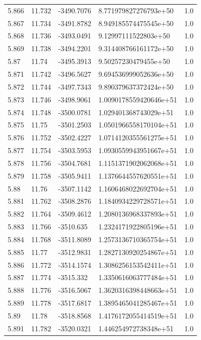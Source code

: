 \begin{tabular}{lllll}
5.866 & 11.732 & -3490.7076 & 8.771979827276793e+50 & 1.0 \\
5.867 & 11.734 & -3491.8782 & 8.949185574475545e+50 & 1.0 \\
5.868 & 11.736 & -3493.0491 & 9.12997111522803e+50 & 1.0 \\
5.869 & 11.738 & -3494.2201 & 9.314408766161172e+50 & 1.0 \\
5.87 & 11.74 & -3495.3913 & 9.50257230479455e+50 & 1.0 \\
5.871 & 11.742 & -3496.5627 & 9.694536999052636e+50 & 1.0 \\
5.872 & 11.744 & -3497.7343 & 9.890379637372424e+50 & 1.0 \\
5.873 & 11.746 & -3498.9061 & 1.0090178559420646e+51 & 1.0 \\
5.874 & 11.748 & -3500.0781 & 1.029401368743029e+51 & 1.0 \\
5.875 & 11.75 & -3501.2503 & 1.0501966558170104e+51 & 1.0 \\
5.876 & 11.752 & -3502.4227 & 1.0714120355561275e+51 & 1.0 \\
5.877 & 11.754 & -3503.5953 & 1.0930559943951667e+51 & 1.0 \\
5.878 & 11.756 & -3504.7681 & 1.1151371902062068e+51 & 1.0 \\
5.879 & 11.758 & -3505.9411 & 1.1376644557620551e+51 & 1.0 \\
5.88 & 11.76 & -3507.1142 & 1.1606468022692704e+51 & 1.0 \\
5.881 & 11.762 & -3508.2876 & 1.1840934229728571e+51 & 1.0 \\
5.882 & 11.764 & -3509.4612 & 1.2080136968337893e+51 & 1.0 \\
5.883 & 11.766 & -3510.635 & 1.2324171922805196e+51 & 1.0 \\
5.884 & 11.768 & -3511.8089 & 1.2573136710365754e+51 & 1.0 \\
5.885 & 11.77 & -3512.9831 & 1.2827130920254867e+51 & 1.0 \\
5.886 & 11.772 & -3514.1574 & 1.3086256153542411e+51 & 1.0 \\
5.887 & 11.774 & -3515.332 & 1.3350616063777484e+51 & 1.0 \\
5.888 & 11.776 & -3516.5067 & 1.3620316398448663e+51 & 1.0 \\
5.889 & 11.778 & -3517.6817 & 1.3895465041285467e+51 & 1.0 \\
5.89 & 11.78 & -3518.8568 & 1.4176172055414519e+51 & 1.0 \\
5.891 & 11.782 & -3520.0321 & 1.446254972738348e+51 & 1.0 \\

\end{tabular}
